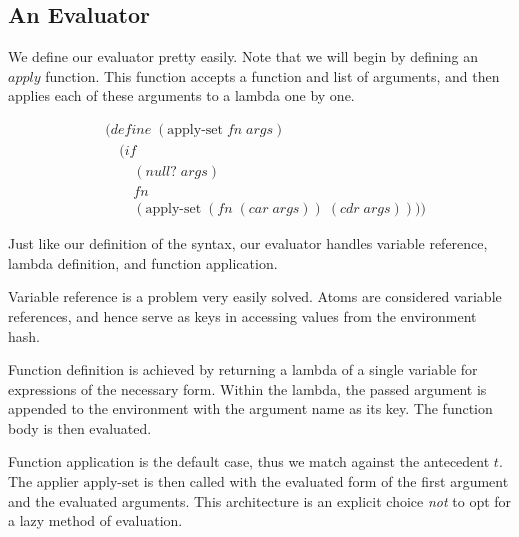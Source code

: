 \subsection{An Evaluator}
We define our evaluator pretty easily. Note that we will begin by defining an 
$apply$ function. This function accepts a function and list of arguments, and 
then applies each of these arguments to a lambda one by one.

\begin{figure}[htp]
\caption{}\label{fig:applySetDef}
\begin{align*}
& (define \; (\text{apply-set} \; fn \; args)
\\& \quad (if
\\& \qquad (null? \; args)
\\& \qquad fn
\\& \qquad (\text{apply-set} \; (fn \; (car \; args)) \; (cdr \; args))))
\end{align*}
\end{figure}

Just like our definition of the syntax, our evaluator handles variable reference, 
lambda definition, and function application. 

Variable reference is a problem very easily solved. Atoms are considered 
variable references, and hence serve as keys in accessing values from the 
environment hash.

Function definition is achieved by returning a lambda of a single variable for 
expressions of the necessary form. Within the lambda, the passed argument is 
appended to the environment with the argument name as its key. The function body 
is then evaluated.

Function application is the default case, thus we match against the antecedent 
$t$. The applier $\text{apply-set}$ is then called with the evaluated form of the first 
argument and the evaluated arguments. This architecture is an explicit choice 
\emph{not} to opt for a lazy method of evaluation.

